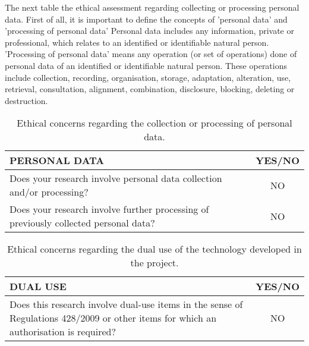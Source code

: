 The next table the ethical assessment regarding collecting or processing personal data. First of all, it is important to define the concepts of 'personal data' and 'processing of personal data' Personal data includes any information, private or professional, which relates to an identified or identifiable natural person. 'Processing of personal data' means any operation (or set of operations) done of personal data of an identified or identifiable natural person. These operations include collection, recording, organisation, storage, adaptation, alteration, use, retrieval, consultation, alignment, combination, disclosure, blocking, deleting or destruction.\\

\begin{table}[H]
	\centering
	\begin{tabular}[H]{ p{12.6cm} c }
		
		\toprule[2pt]
		
		\textbf{PERSONAL DATA} & \textbf{YES/NO} \\
		
		\midrule[1.5pt]
		
		Does your research involve personal data collection and/or processing?\vspace{0.2cm} & NO \\
		
		Does your research involve further processing of previously collected personal data?\vspace{0.2cm} & NO \\
		
	    \bottomrule[2pt]
	    	
	\end{tabular}
	\caption[Ethics - Personal data]{Ethical concerns regarding the collection or processing of personal data.}
	\label{Ethics_personaldata}
\end{table}



\begin{table}[H]
	\centering
	\begin{tabular}[H]{ p{12.6cm} c }
		
		\toprule[2pt]
		
		\textbf{DUAL USE} & \textbf{YES/NO} \\
		
		\midrule[1.5pt]
		
		Does this research involve dual-use items in the sense of Regulations 428/2009 or other items for which an authorisation is required?\vspace{0.2cm} & NO\\
		
		\bottomrule[2pt]	
			
	\end{tabular}
	\caption[Ethics - Dual use]{Ethical concerns regarding the dual use of the technology developed in the project.}
	\label{Ethics_Dualuse}
\end{table}




